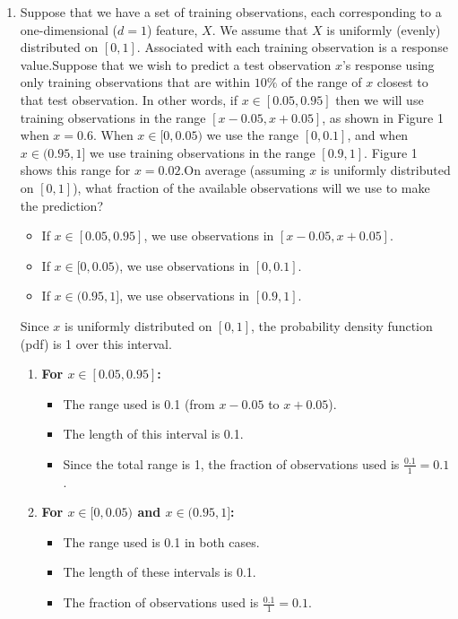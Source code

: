 \documentclass[a3paper,12pt]{extarticle} %
\begin{document}
\begin{enumerate}
    \item Suppose that we have a set of training observations, each corresponding to a one-dimensional ($d = 1$) feature, $X$. We assume that $X$ is uniformly (evenly) distributed on $[0, 1]$. Associated with each training observation is a response value.Suppose that we wish to predict a test observation $x$'s response using only training observations that are within $10\%$ of the range of $x$ closest to that test observation. In other words, if $x \in [0.05, 0.95]$ then we will use training observations in the range $[x - 0.05, x + 0.05]$, as shown in Figure 1 when $x = 0.6$. When $x \in [0, 0.05)$ we use the range $[0, 0.1]$, and when $x \in (0.95, 1]$ we use training observations in the range $[0.9, 1]$. Figure 1 shows this range for $x = 0.02$.On average (assuming $x$ is uniformly distributed on $[0, 1]$), what fraction of the available observations will we use to make the prediction?
    \begin{itemize}
        \item If \(x \in [0.05, 0.95]\), we use observations in \([x - 0.05, x + 0.05]\).
        \item If \(x \in [0, 0.05)\), we use observations in \([0, 0.1]\).
        \item If \(x \in (0.95, 1]\), we use observations in \([0.9, 1]\).
    \end{itemize}
    
    
    Since \(x\) is uniformly distributed on \([0, 1]\), the probability density function (pdf) is 1 over this interval.
    
    \begin{enumerate}
        \item \textbf{For \(x \in [0.05, 0.95]\):}
        \begin{itemize}
            \item The range used is 0.1 (from \(x - 0.05\) to \(x + 0.05\)).
            \item The length of this interval is 0.1.
            \item Since the total range is 1, the fraction of observations used is \(\frac{0.1}{1} = 0.1\).
        \end{itemize}
    
        \item \textbf{For \(x \in [0, 0.05)\) and \(x \in (0.95, 1]\):}
        \begin{itemize}
            \item The range used is 0.1 in both cases.
            \item The length of these intervals is 0.1.
            \item The fraction of observations used is \(\frac{0.1}{1} = 0.1\).
        \end{itemize}
    \end{enumerate}
    

\end{enumerate}
\end{document}
